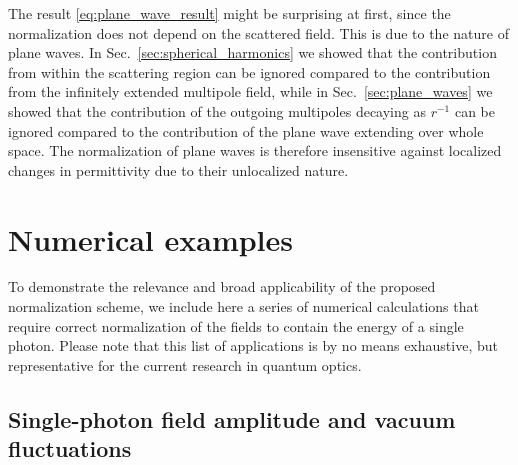 \documentclass[10pt,letterpaper]{article}
\begin{document}
The result \eqref{eq:plane_wave_result} might be surprising at first, since the normalization does not depend on the scattered field. This is due to the nature of plane waves. In Sec.~\ref{sec:spherical_harmonics} we showed that the contribution from within the scattering region can be ignored compared to the contribution from the infinitely extended multipole field, while in Sec.~\ref{sec:plane_waves} we showed that the contribution of the outgoing multipoles decaying as $r^{-1}$ can be ignored compared to the contribution of the plane wave extending over whole space. The normalization of plane waves is therefore insensitive against localized changes in permittivity due to their unlocalized nature.

\section{Numerical examples}
\label{sec:numerics}

To demonstrate the relevance and broad applicability of the proposed normalization scheme, we include here a series of numerical calculations that require correct normalization of the fields to contain the energy of a single photon. Please note that this list of applications is by no means exhaustive, but representative for the current research in quantum optics.

\subsection{Single-photon field amplitude and vacuum fluctuations}
\end{document}
